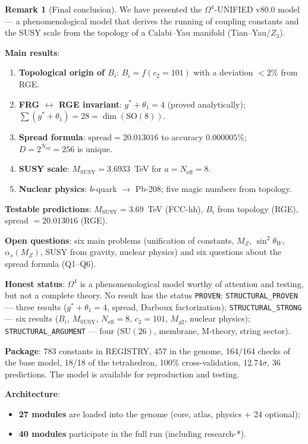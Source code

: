 \documentclass[11pt,a4paper]{article}
\newcommand{\SU}{\ensuremath{\mathrm{SU}}}
\newcommand{\SO}{\ensuremath{\mathrm{SO}}}
\newcommand{\Om}{\ensuremath{\Omega^4}}
\theoremstyle{definition}
\newtheorem{remark}[theorem]{Remark}
\begin{document}
\begin{remark}[Final conclusion]
\label{rem:conclusions-final-statement}
We have presented the $\Om$-UNIFIED v80.0 model ---
a phenomenological model that derives the running of coupling constants
and the SUSY scale from the topology of a Calabi--Yau manifold
(Tian--Yau$/Z_3$).

\medskip\noindent
\textbf{Main results}:
\begin{enumerate}
    \item \textbf{Topological origin of $B_i$}:
          $B_i = f(c_2 = 101)$ with a deviation $< 2\%$ from RGE.
    \item \textbf{FRG $\leftrightarrow$ RGE invariant}:
          $g^* + \theta_1 = 4$ (proved analytically);
          $\sum(g^* + \theta_1) = 28 = \dim(\SO(8))$.
    \item \textbf{Spread formula}:
          $\text{spread} = 20.013016$ to accuracy $0.000005\%$;
          $D = 2^{N_{\text{eff}}} = 256$ is unique.
    \item \textbf{SUSY scale}:
          $M_{\text{SUSY}} = 3.6933$~TeV for $a = N_{\text{eff}} = 8$.
    \item \textbf{Nuclear physics}:
          $b$-quark $\to$ Pb-208; five magic numbers
          from topology.
\end{enumerate}

\medskip\noindent
\textbf{Testable predictions}:
$M_{\text{SUSY}} = 3.69$~TeV (FCC-hh),
$B_i$ from topology (RGE),
spread $= 20.013016$ (RGE).

\medskip\noindent
\textbf{Open questions}:
six main problems (unification of constants, $M_Z$,
$\sin^2\theta_W$, $\alpha_s(M_Z)$, SUSY from gravity,
nuclear physics)
and six questions about the spread formula (Q1--Q6).

\medskip\noindent
\textbf{Honest status}:
$\Om$ is a phenomenological model worthy of
attention and testing, but not a complete theory.
No result has the status \texttt{PROVEN};
\texttt{STRUCTURAL\_PROVEN} --- three results
($g^* + \theta_1 = 4$, spread, Darboux factorization);
\texttt{STRUCTURAL\_STRONG} --- six results
($B_i$, $M_{\text{SUSY}}$, $N_{\text{eff}} = 8$, $c_2 = 101$,
$M_{g2}$, nuclear physics); \texttt{STRUCTURAL\_ARGUMENT} --- four
($\SU(26)$, membrane, M-theory, string sector).

\medskip\noindent
\textbf{Package}: 783 constants in REGISTRY, 457 in the genome,
164/164 checks of the base model, 18/18 of the tetrahedron,
100\% cross-validation, 12.74$\sigma$, 36 predictions.
The model is available for reproduction and testing.

\medskip\noindent
\textbf{Architecture}:
\begin{itemize}
    \item \textbf{27 modules} are loaded into the genome
          (core, atlas, physics + 24 optional);
    \item \textbf{40 modules} participate in the full run
          (including research-*).
\end{itemize}
\end{remark}
\end{document}
